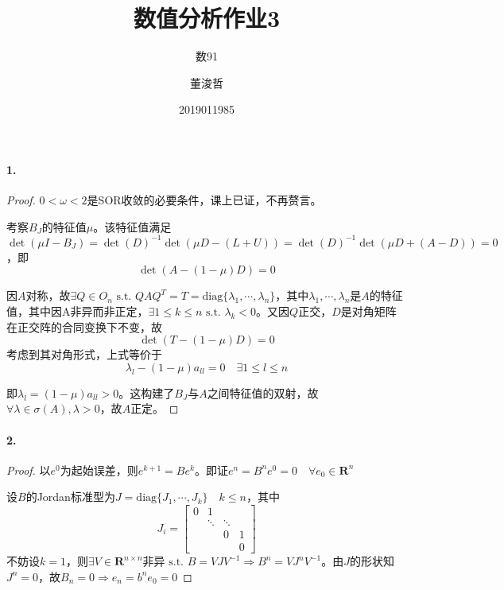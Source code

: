 \documentclass{ctexart}
\title{数值分析作业3}
\author{数91\and 董浚哲\and 2019011985}
\begin{document}
\maketitle
\newcommand{\R}{\mathbf{R}}
\newcommand{\dd}{\,\mathrm{d}}
\newcommand{\st}{\text{ s.t. }}
\newcommand{\pp}[2]{\frac{\partial #1}{\partial #2}}
\newcommand{\nm}[1]{\left\|#1\right\|}

\paragraph{1.}
\begin{proof}
$0<\omega<2$是SOR收敛的必要条件，课上已证，不再赘言。

考察$B_J$的特征值$\mu$。该特征值满足$\det(\mu I-B_J)=\det(D)^{-1}\det(\mu D-(L+U))=\det(D)^{-1}\det(\mu D+(A-D))=0$，即
\[\det(A-(1-\mu)D)=0\]

因$A$对称，故$\exists Q\in O_n\st QAQ^T=T=\mathrm{diag}\{\lambda_1,\cdots,\lambda_n\}$，其中$\lambda_1,\cdots,\lambda_n$是$A$的特征值，其中因A非异而非正定，$\exists 1\leq k\leq n\st \lambda_k<0$。又因$Q$正交，$D$是对角矩阵在正交阵的合同变换下不变，故
\[\det(T-(1-\mu)D)=0\]
考虑到其对角形式，上式等价于
\[\lambda_l-(1-\mu)a_{ll}=0\quad \exists 1\leq l\leq n\]

即$\lambda_l=(1-\mu)a_{ll}>0$。这构建了$B_J$与$A$之间特征值的双射，故$\forall\lambda\in \sigma(A),\lambda>0$，故$A$正定。
\end{proof}

\paragraph{2.}
\begin{proof}
以$e^0$为起始误差，则$e^{k+1}=Be^k$。即证$e^n=B^ne^0=0\quad\forall e_0\in \R^n$

设$B$的Jordan标准型为$J=\mathrm{diag}\{J_1,\cdots,J_k\}\quad k\leq n$，其中
\[J_i=
\begin{bmatrix}
0&1& & \\
 &\ddots&\ddots& \\
 & &0&1\\
 & & &0
\end{bmatrix}\]
不妨设$k=1$，则$\exists V\in\R^{n\times n}$非异$\st B=VJV^{-1}\Rightarrow B^n=VJ^nV^{-1}$。由$J$的形状知$J^n=0$，故$B_n=0\Rightarrow e_n=b^ne_0=0$
\end{proof}
\end{document}
